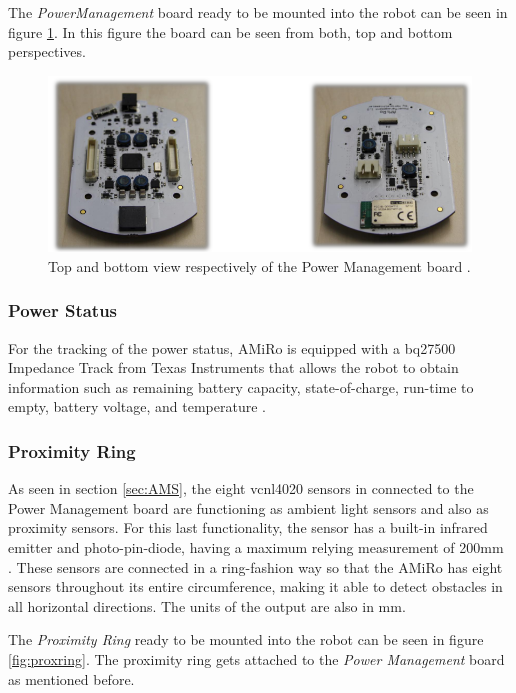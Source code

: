 \documentclass[12pt]{report}%
\begin{document}
The \textit{PowerManagement} board ready to be mounted into the robot can be seen in figure \ref{fig:powerm}. In this figure the board can be seen from both, top and bottom perspectives.

\begin{figure}[ht]
	\centering
	\includegraphics[width=\textwidth]{power_real}
    \caption{Top and bottom view respectively of the Power Management board \cite{AMiRo_ppt_v1}.}
    \label{fig:powerm}
\end{figure}
\clearpage

\subsubsection{Power Status}
For the tracking of the power status, AMiRo is equipped with a bq27500 Impedance Track from Texas Instruments that allows the robot to obtain information such as remaining battery capacity, state-of-charge, run-time to empty, battery voltage, and temperature \cite{impedancepart}.

\subsubsection{Proximity Ring}
As seen in section \ref{sec:AMS}, the eight vcnl4020 sensors in connected to the Power Management board are functioning as ambient light sensors and also as proximity sensors. For this last functionality, the sensor has a built-in infrared emitter and photo-pin-diode, having a maximum relying measurement of 200mm \cite{proxsensor}. These sensors are connected in a ring-fashion way so that the AMiRo has eight sensors throughout its entire circumference, making it able to detect obstacles in all horizontal directions. The units of the output are also in mm.

The \textit{Proximity Ring} ready to be mounted into the robot can be seen in figure \ref{fig:proxring}. The proximity ring gets attached to the \textit{Power Management} board as mentioned before.
\end{document}
